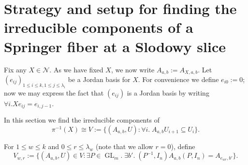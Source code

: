 \documentclass[12pt,psamsfonts]{article}
\DeclareMathOperator{\GL}{GL}
\begin{document}
\section{Strategy and setup for finding the irreducible components of a Springer fiber at a Slodowy slice}
\par Fix any \(X \in \mathcal{N}\).
As we have fixed \(X\), we now write \(A_{a, b} := A_{X, a, b}\).
Let \((e_{ij})_{1 \leq i \leq k, 1 \leq j \leq \lambda_i}\) be a Jordan basis for \(X\).
For convenience we define \(e_{i0} := 0\); now we may express the fact that \((e_{ij})\) is a Jordan basis by writing \(\forall i. Xe_{ij} = e_{i,j - 1}\).
\par In this section we find the irreducible components of
\[\pi^{-1}(X) \cong V := \{(A_{a, b}, U) : \forall i. \; A_{a, b} U_{i + 1} \subseteq U_i\}.\]
\par For \(1 \leq w \leq k\) and \(0 \leq r \leq \lambda_w\) (note that we allow \(r = 0\)), define 
\[V_{w,r} := \{(A_{a, b}, U) \in V : \exists P \in \GL_{m}. \; \exists b'. \; (P^{-1}, I_n) A_{a, b} (P, I_n) = A_{e_{wr}, b'} \}.\]
\end{document}

